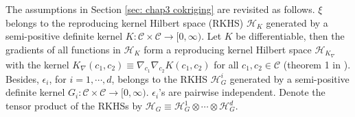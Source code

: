 The assumptions in Section \ref{sec: chap3 cokriging} are revisited as follows.
$\xi$ 
belongs to the reproducing kernel Hilbert space (RKHS) $\mathcal{H}_K$ generated by a
semi-positive definite
kernel $K: \mathcal{C}\times \mathcal{C} \rightarrow [0,\infty)$.
Let $K$ be differentiable, then the gradients of all functions in $\mathcal{H}_K$
form a reproducing kernel Hilbert space $\mathcal{H}_{K_\nabla}$ with
the kernel $K_\nabla(c_1,c_2) \equiv \nabla_{c_1}\nabla_{c_2}K(c_1, c_2)$ 
for all $c_1,c_2\in \mathcal{C}$ (theorem 1 in \cite{derivative RKHS}).
Besides, $\epsilon_i$, for $i=1,\cdots, d$, belongs to the RKHS
$\mathcal{H}_{G}^i$ generated by a semi-positive definite
kernel $G_i: \mathcal{C}\times \mathcal{C} \rightarrow [0, \infty)$. $\epsilon_i$'s are pairwise
independent. 
Denote the tensor product of the RKHSs
by $\mathcal{H}_G \equiv \mathcal{H}_{G}^1 \otimes \cdots \otimes \mathcal{H}_G^d$.\\

